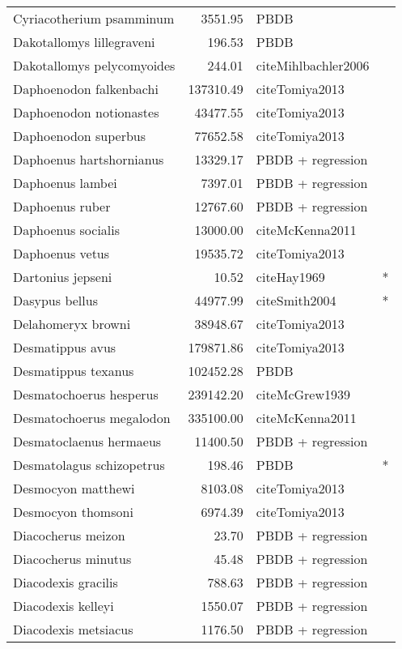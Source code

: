\begin{table}[ht]
\begin{tabular}{lrll}
  Cyriacotherium psamminum & 3551.95 & PBDB &  \\ 
  Dakotallomys lillegraveni & 196.53 & PBDB &  \\ 
  Dakotallomys pelycomyoides & 244.01 & cite{Mihlbachler2006} &  \\ 
  Daphoenodon falkenbachi & 137310.49 & cite{Tomiya2013} &  \\ 
  Daphoenodon notionastes & 43477.55 & cite{Tomiya2013} &  \\ 
  Daphoenodon superbus & 77652.58 & cite{Tomiya2013} &  \\ 
  Daphoenus hartshornianus & 13329.17 & PBDB + regression &  \\ 
  Daphoenus lambei & 7397.01 & PBDB + regression &  \\ 
  Daphoenus ruber & 12767.60 & PBDB + regression &  \\ 
  Daphoenus socialis & 13000.00 & cite{McKenna2011} &  \\ 
  Daphoenus vetus & 19535.72 & cite{Tomiya2013} &  \\ 
  Dartonius jepseni & 10.52 & cite{Hay1969} & * \\ 
  Dasypus bellus & 44977.99 & cite{Smith2004} & * \\ 
  Delahomeryx browni & 38948.67 & cite{Tomiya2013} &  \\ 
  Desmatippus avus & 179871.86 & cite{Tomiya2013} &  \\ 
  Desmatippus texanus & 102452.28 & PBDB &  \\ 
  Desmatochoerus hesperus & 239142.20 & cite{McGrew1939} &  \\ 
  Desmatochoerus megalodon & 335100.00 & cite{McKenna2011} &  \\ 
  Desmatoclaenus hermaeus & 11400.50 & PBDB + regression &  \\ 
  Desmatolagus schizopetrus & 198.46 & PBDB & * \\ 
  Desmocyon matthewi & 8103.08 & cite{Tomiya2013} &  \\ 
  Desmocyon thomsoni & 6974.39 & cite{Tomiya2013} &  \\ 
  Diacocherus meizon & 23.70 & PBDB + regression &  \\ 
  Diacocherus minutus & 45.48 & PBDB + regression &  \\ 
  Diacodexis gracilis & 788.63 & PBDB + regression &  \\ 
  Diacodexis kelleyi & 1550.07 & PBDB + regression &  \\ 
  Diacodexis metsiacus & 1176.50 & PBDB + regression &  \\ 

\end{tabular}
\end{table}
